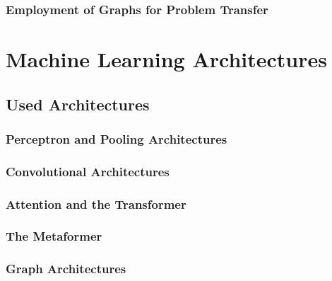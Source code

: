 \documentclass[
headings=optiontohead,              %
12pt,                               %
DIV=13,                             %
twoside=true,                       %
open=any,                         %
BCOR=10mm,                          %
toc=bibliographynumbered            %
]{scrreport}
\begin{document}
        \subsection{Employment of Graphs for Problem Transfer}
        \label{sec:theory-graphs}
        
        \FloatBarrier

\chapter{Machine Learning Architectures}
\label{sec:architectures}

    \section{Used Architectures}
    \label{sec:architectures-theory}
    
        \subsection{Perceptron and Pooling Architectures}
        \label{sec:architectures-perceptron-pooling}
        
        \FloatBarrier
        \subsection{Convolutional Architectures}
        \label{sec:architectures-convolution}
        
        \FloatBarrier
        \subsection{Attention and the Transformer}
        \label{sec:architectures-attention}
        
        \FloatBarrier
        \subsection{The Metaformer}
        \label{sec:architectures-metaformer}
        
        \FloatBarrier
        \subsection{Graph Architectures}
        \label{sec:architectures-graphs}
        
        \FloatBarrier
\end{document}
